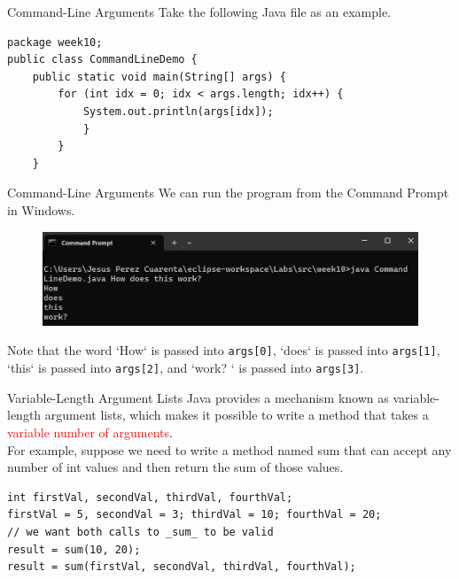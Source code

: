 \documentclass[11pt]{beamer}
\newcommand{\red}[1]{\textcolor{red}{#1}}
\begin{document}
\begin{frame}[fragile]
{Command-Line Arguments}
Take the following Java file as an example.
    \begin{lstlisting}
package week10;
public class CommandLineDemo {
	public static void main(String[] args) {
		for (int idx = 0; idx < args.length; idx++) {
			System.out.println(args[idx]);
			}
		}
	}
    \end{lstlisting}
\end{frame}

\begin{frame}[fragile]
{Command-Line Arguments}
We can run the program from the Command Prompt in Windows.
    \noindent 
    \begin{figure}[H]
    \centering
    \includegraphics[scale=0.6]{Images/chapter07_section12_cmdArgs.png}
    \end{figure}
    Note that the word `How` is passed into \texttt{args[0]}, `does` is passed into \texttt{args[1]}, `this` is passed into \texttt{args[2]}, and `work? ` is passed into \texttt{args[3]}.
\end{frame}

\begin{frame}[fragile]
{Variable-Length Argument Lists}
    Java provides a mechanism known as variable-length argument lists, which makes it possible to write a method that takes a \red{variable number of arguments}. \\ \vspace{1em}
    For example, suppose we need to write a method named sum that can accept any number of int values and then return the sum of those values.
    \begin{lstlisting}
int firstVal, secondVal, thirdVal, fourthVal;
firstVal = 5, secondVal = 3; thirdVal = 10; fourthVal = 20;
// we want both calls to _sum_ to be valid
result = sum(10, 20);
result = sum(firstVal, secondVal, thirdVal, fourthVal);
    \end{lstlisting}
\end{frame}
\end{document}
